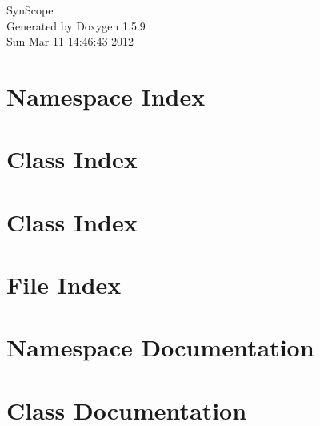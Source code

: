 \documentclass[a4paper]{book}
\begin{document}
\hypersetup{pageanchor=false}
\begin{titlepage}
\vspace*{7cm}
\begin{center}
{\Large SynScope }\\
\vspace*{1cm}
{\large Generated by Doxygen 1.5.9}\\
\vspace*{0.5cm}
{\small Sun Mar 11 14:46:43 2012}\\
\end{center}
\end{titlepage}
\clearemptydoublepage
{}
\tableofcontents
\clearemptydoublepage
{}
\hypersetup{pageanchor=true}
\chapter{Namespace Index}

\chapter{Class Index}

\chapter{Class Index}

\chapter{File Index}

\chapter{Namespace Documentation}

\chapter{Class Documentation}






























\end{document}
